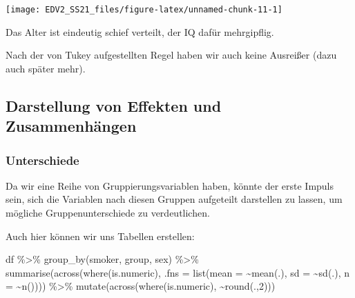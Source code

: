 \documentclass[
]{book}
\newenvironment{Shaded}{\begin{snugshade}}{\end{snugshade}}
\newcommand{\AttributeTok}[1]{\textcolor[rgb]{0.77,0.63,0.00}{#1}}
\newcommand{\DecValTok}[1]{\textcolor[rgb]{0.00,0.00,0.81}{#1}}
\newcommand{\FunctionTok}[1]{\textcolor[rgb]{0.00,0.00,0.00}{#1}}
\newcommand{\NormalTok}[1]{#1}
\newcommand{\SpecialCharTok}[1]{\textcolor[rgb]{0.00,0.00,0.00}{#1}}
\begin{document}
\begin{center}\texttt{[image: EDV2\_SS21\_files/figure-latex/unnamed-chunk-11-1]} \end{center}

Das Alter ist eindeutig schief verteilt, der IQ dafür mehrgipflig.

Nach der von Tukey aufgestellten Regel \citep{tukeyExploratoryDataAnalysis1977} haben wir auch keine Ausreißer (dazu auch später mehr).

\hypertarget{darstellung-von-effekten-und-zusammenhuxe4ngen}{%
\subsection{Darstellung von Effekten und Zusammenhängen}\label{darstellung-von-effekten-und-zusammenhuxe4ngen}}

\hypertarget{unterschiede}{%
\subsubsection{Unterschiede}\label{unterschiede}}

Da wir eine Reihe von Gruppierungsvariablen haben, könnte der erste Impuls sein, sich die Variablen nach diesen Gruppen aufgeteilt darstellen zu lassen, um mögliche Gruppenunterschiede zu verdeutlichen.

Auch hier können wir uns Tabellen erstellen:

\begin{Shaded}
\begin{Highlighting}[]
\NormalTok{df }\SpecialCharTok{\%\textgreater{}\%} 
  \FunctionTok{group\_by}\NormalTok{(smoker, group, sex) }\SpecialCharTok{\%\textgreater{}\%} 
  \FunctionTok{summarise}\NormalTok{(}\FunctionTok{across}\NormalTok{(}\FunctionTok{where}\NormalTok{(is.numeric),}
                   \AttributeTok{.fns =} \FunctionTok{list}\NormalTok{(}\AttributeTok{mean =} \SpecialCharTok{\textasciitilde{}}\FunctionTok{mean}\NormalTok{(.),}
                               \AttributeTok{sd =} \SpecialCharTok{\textasciitilde{}}\FunctionTok{sd}\NormalTok{(.),}
                               \AttributeTok{n =} \SpecialCharTok{\textasciitilde{}}\FunctionTok{n}\NormalTok{()))) }\SpecialCharTok{\%\textgreater{}\%} 
  \FunctionTok{mutate}\NormalTok{(}\FunctionTok{across}\NormalTok{(}\FunctionTok{where}\NormalTok{(is.numeric),}
                \SpecialCharTok{\textasciitilde{}}\FunctionTok{round}\NormalTok{(.,}\DecValTok{2}\NormalTok{)))}
\end{Highlighting}
\end{Shaded}
\end{document}
